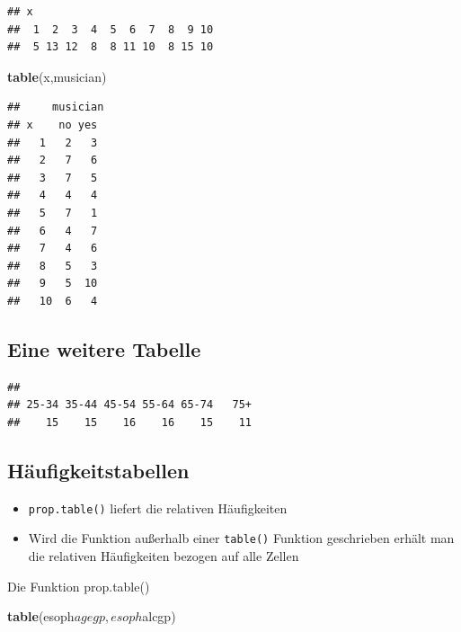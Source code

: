 \documentclass[]{article}
\newenvironment{Shaded}{\begin{snugshade}}{\end{snugshade}}
\newcommand{\KeywordTok}[1]{\textcolor[rgb]{0.13,0.29,0.53}{\textbf{{#1}}}}
\newcommand{\NormalTok}[1]{{#1}}
\providecommand{\tightlist}{%
  \setlength{\itemsep}{0pt}\setlength{\parskip}{0pt}}
\begin{document}
\begin{verbatim}
## x
##  1  2  3  4  5  6  7  8  9 10 
##  5 13 12  8  8 11 10  8 15 10
\end{verbatim}

\begin{Shaded}
\begin{Highlighting}[]
\KeywordTok{table}\NormalTok{(x,musician)}
\end{Highlighting}
\end{Shaded}

\begin{verbatim}
##     musician
## x    no yes
##   1   2   3
##   2   7   6
##   3   7   5
##   4   4   4
##   5   7   1
##   6   4   7
##   7   4   6
##   8   5   3
##   9   5  10
##   10  6   4
\end{verbatim}

\subsection{Eine weitere Tabelle}\label{eine-weitere-tabelle}

\begin{Shaded}
\end{Shaded}

\begin{verbatim}
## 
## 25-34 35-44 45-54 55-64 65-74   75+ 
##    15    15    16    16    15    11
\end{verbatim}

\subsection{Häufigkeitstabellen}\label{haufigkeitstabellen}

\begin{itemize}
\tightlist
\item
  \texttt{prop.table()} liefert die relativen Häufigkeiten
\item
  Wird die Funktion außerhalb einer \texttt{table()} Funktion
  geschrieben erhält man die relativen Häufigkeiten bezogen auf alle
  Zellen
\end{itemize}

Die Funktion prop.table()

\begin{Shaded}
\begin{Highlighting}[]
\KeywordTok{table}\NormalTok{(esoph$agegp,esoph$alcgp)}
\end{Highlighting}
\end{Shaded}
\end{document}
